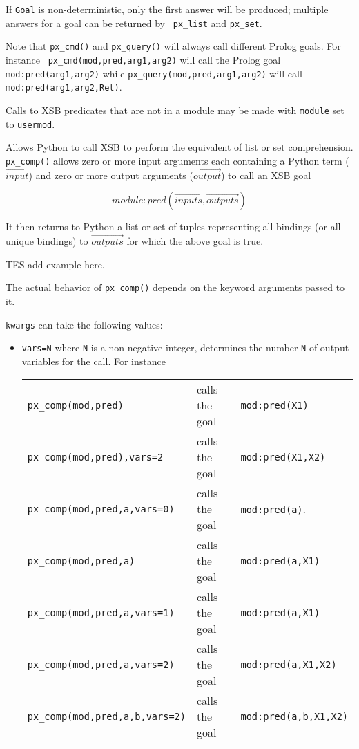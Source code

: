 \begin{description}
     If {\tt Goal} is non-deterministic, only the first answer will be
     produced; multiple answers for a goal can be returned by {\tt
       px\_list} and {\tt px\_set}.

     Note that {\tt px\_cmd()} and {\tt px\_query()} will always call
     different Prolog goals.  For instance {\tt
       px\_cmd(mod,pred,arg1,arg2)} will call the Prolog goal {\tt
       mod:pred(arg1,arg2)} while {\tt px\_query(mod,pred,arg1,arg2)}
     will call {\tt mod:pred(arg1,arg2,Ret)}.
     
     Calls to XSB predicates that are not in a module may be made with
     {\tt module} set to {\tt usermod}.

%
  
  Allows Python to call XSB to perform the equivalent of list or set
  comprehension.  {\tt px\_comp()} allows zero or more input arguments
  each containing a Python term ($\overrightarrow{input}$) and zero or
  more output arguments ($\overrightarrow{output}$) to call an XSB goal

\[module:pred(\overrightarrow{inputs},\overrightarrow{outputs}) \]

It then returns to Python a list or set of tuples representing all
bindings (or all unique bindings) to $\overrightarrow{outputs}$ for
which the above goal is true.

{\sc TES add example here.}

The actual behavior of {\tt px\_comp()}
depends on the keyword arguments passed to it.

{\tt kwargs} can take the following values:
\begin{itemize}
  \item {\tt vars=N} where {\tt N} is a non-negative integer,
    determines the number {\tt N} of output variables for the call.
    For instance
    
\begin{tabular}{lll}
    {\tt px\_comp(mod,pred)}            & calls the goal & {\tt mod:pred(X1)} \\
    {\tt px\_comp(mod,pred),vars=2}     & calls the goal & {\tt mod:pred(X1,X2)} \\
    {\tt px\_comp(mod,pred,a,vars=0)}   & calls the goal & {\tt mod:pred(a)}. \\
    {\tt px\_comp(mod,pred,a)}          & calls the goal & {\tt mod:pred(a,X1)} \\
    {\tt px\_comp(mod,pred,a,vars=1)}   & calls the goal & {\tt mod:pred(a,X1)} \\
    {\tt px\_comp(mod,pred,a,vars=2)}   & calls the goal & {\tt mod:pred(a,X1,X2)} \\
    {\tt px\_comp(mod,pred,a,b,vars=2)} & calls the goal & {\tt mod:pred(a,b,X1,X2)} \\
\end{tabular}    
    

\end{itemize}
\end{description}
